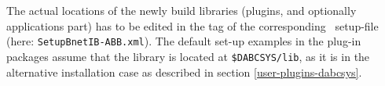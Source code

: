 \item The actual locations of the newly build libraries (plugins, and optionally applications part) has to be edited in the 
 tag of the corresponding \dabc\ setup-file (here: {\tt SetupBnetIB-ABB.xml}).
The default set-up examples in the plug-in packages assume that the library is located
at {\tt \$DABCSYS/lib}, as it is in the alternative installation case as described in
section \ref{user-plugins-dabcsys}.

\enum


